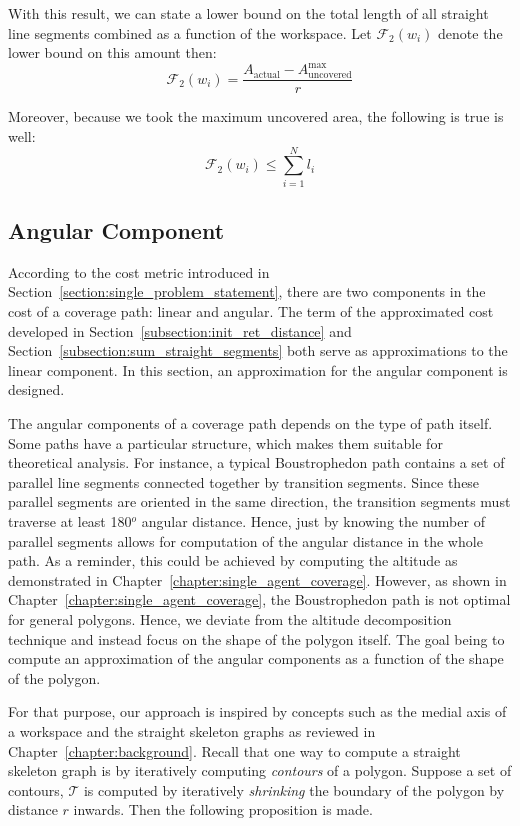 \documentclass[../main.tex]{subfiles}
\begin{document}
With this result, we can state a lower bound on the total length of all straight line segments combined as a function of the workspace. Let $\mathcal{F}_2(w_i)$ denote the lower bound on this amount then:
\begin{equation}
	\mathcal{F}_2(w_i)=\frac{A_{\text{actual}}-A_{\text{uncovered}}^{\max}}{r}
\end{equation}

Moreover, because we took the maximum uncovered area, the following is true is well:
\begin{equation}
	\mathcal{F}_2(w_i)\leq\sum_{i=1}^Nl_i
\end{equation}


\subsection{Angular Component}
\label{subsection:angular_component}


According to the cost metric introduced in Section~\ref{section:single_problem_statement}, there are two components in the cost of a coverage path: linear and angular. The term of the approximated cost developed in Section~\ref{subsection:init_ret_distance} and Section~\ref{subsection:sum_straight_segments} both serve as approximations to the linear component. In this section, an approximation for the angular component is designed.

The angular components of a coverage path depends on the type of path itself. Some paths have a particular structure, which makes them suitable for theoretical analysis. For instance, a typical Boustrophedon path contains a set of parallel line segments connected together by transition segments. Since these parallel segments are oriented in the same direction, the transition segments must traverse at least 180$^o$ angular distance. Hence, just by knowing the number of parallel segments allows for computation of the angular distance in the whole path. As a reminder, this could be achieved by computing the altitude as demonstrated in Chapter~\ref{chapter:single_agent_coverage}. However, as shown in Chapter~\ref{chapter:single_agent_coverage}, the Boustrophedon path is not optimal for general polygons. Hence, we deviate from the altitude decomposition technique and instead focus on the shape of the polygon itself. The goal being to compute an approximation of the angular components as a function of the shape of the polygon.

For that purpose, our approach is inspired by concepts such as the medial axis of a workspace and the straight skeleton graphs as reviewed in Chapter~\ref{chapter:background}. Recall that one way to compute a straight skeleton graph is by iteratively computing \emph{contours} of a polygon. Suppose a set of contours, $\mathcal{T}$ is computed by iteratively \emph{shrinking} the boundary of the polygon by distance $r$ inwards. Then the following proposition is made.
\end{document}
